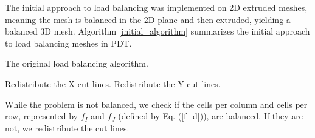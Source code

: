 \documentclass[letterpaper]{mandc2019}
\begin{document}
The initial approach to load balancing was implemented on 2D extruded meshes, meaning the mesh is balanced in the 2D plane and then extruded, yielding a balanced 3D mesh. Algorithm \ref{initial_algorithm} summarizes the initial approach to load balancing meshes in PDT.

\begin{algorithm}[htb]
\caption{The original load balancing algorithm.}
\label{initial_algorithm}
\begin{algorithmic}

    \STATE Redistribute the X cut lines.
  \ENDIF
  	\STATE Redistribute the Y cut lines.
  \ENDIF
\ENDWHILE
\end{algorithmic}
\end{algorithm}
While the problem is not balanced, we check if the cells per column and cells per row, represented by $f_I$ and $f_J$ (defined by Eq. (\ref{f_d})), are balanced. If they are not, we redistribute the cut lines. 
\end{document}
